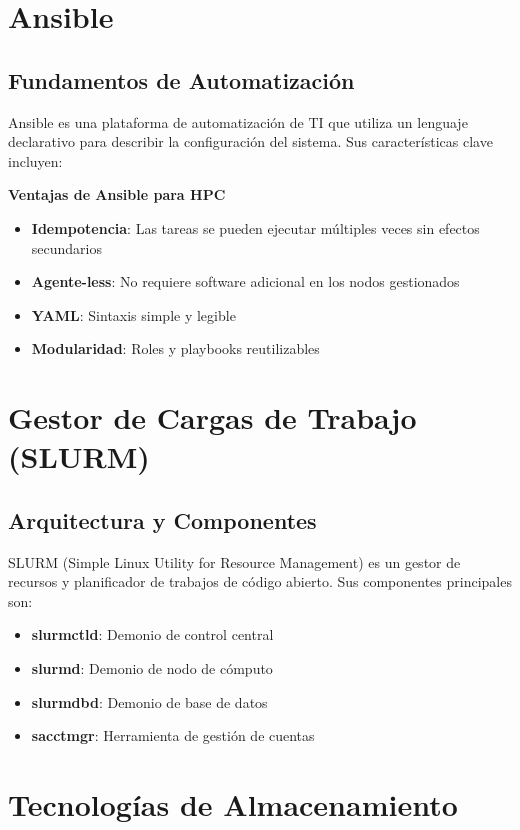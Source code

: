 \section{Ansible}
\subsection{Fundamentos de Automatización}
Ansible es una plataforma de automatización de TI que utiliza un lenguaje declarativo para describir la configuración del sistema. Sus características clave incluyen:

\begin{infocaja}
\textbf{Ventajas de Ansible para HPC}
\begin{itemize}
    \item \textbf{Idempotencia}: Las tareas se pueden ejecutar múltiples veces sin efectos secundarios
    \item \textbf{Agente-less}: No requiere software adicional en los nodos gestionados
    \item \textbf{YAML}: Sintaxis simple y legible
    \item \textbf{Modularidad}: Roles y playbooks reutilizables
\end{itemize}
\end{infocaja}

\section{Gestor de Cargas de Trabajo (SLURM)}
\subsection{Arquitectura y Componentes}
SLURM (Simple Linux Utility for Resource Management) es un gestor de recursos y planificador de trabajos de código abierto. Sus componentes principales son:

\begin{itemize}
    \item \textbf{slurmctld}: Demonio de control central
    \item \textbf{slurmd}: Demonio de nodo de cómputo
    \item \textbf{slurmdbd}: Demonio de base de datos
    \item \textbf{sacctmgr}: Herramienta de gestión de cuentas
\end{itemize}

\section{Tecnologías de Almacenamiento}
